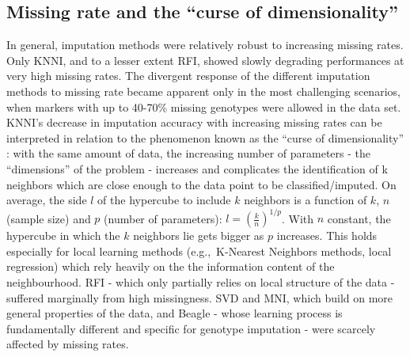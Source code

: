 \subsection{Missing rate and the ``curse of dimensionality''}
\label{sec:missing_rate_curse_dimensionality}
In general, imputation methods were relatively robust to increasing missing rates. Only KNNI, and to a lesser extent RFI, showed slowly degrading performances at very high missing rates. The divergent response of the different imputation methods to missing rate became apparent only in the most challenging scenarios, when markers with up to 40-70\% missing genotypes were allowed in the data set.\\
KNNI's decrease in imputation accuracy with increasing missing rates can be interpreted in relation to the phenomenon known as the ``curse of dimensionality'' \cite{bellman_dynamic_1957,marimont_nearest_1979}: with the same amount of data, the increasing number of parameters - the ``dimensions'' of the problem - increases and complicates the identification of k neighbors which are close enough to the data point to be classified/imputed. 
On average, the side $l$ of the hypercube to include $k$ neighbors is a function of $k$, $n$ (sample size) and $p$ (number of parameters): $l = \left ( \frac{k}{n} \right )^{1/p}$. With $n$ constant, the hypercube in which the $k$ neighbors lie gets bigger as $p$ increases. This holds especially for local learning methods (e.g.,~K-Nearest Neighbors methods, local regression) which rely heavily on the the information content of the neighbourhood. RFI - which only partially relies on local structure of the data - suffered marginally from high missingness. SVD and MNI, which build on more general properties of the data, and Beagle - whose learning process is fundamentally different and specific for genotype imputation - were scarcely affected by missing rates.

